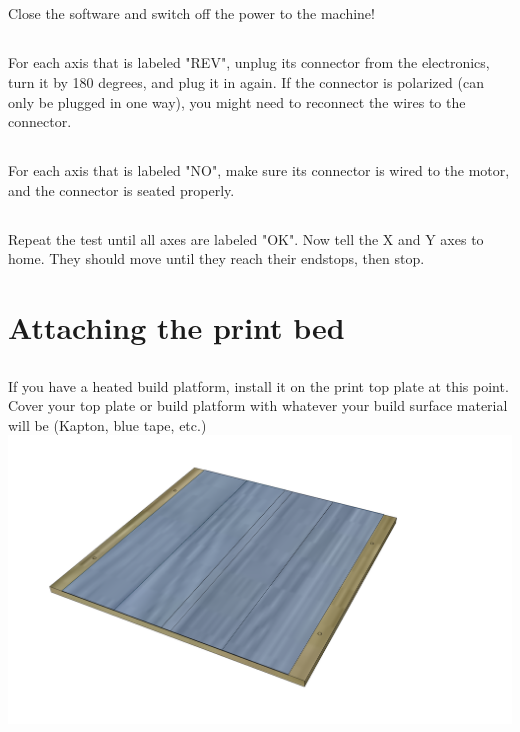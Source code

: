 \documentclass[twoside,openany,a4paper,titlepage]{memoir}
\begin{document}
	\section{}
	Close the software and switch off the power to the machine!
	
	\section{}
	For each axis that is labeled "REV", unplug its connector from the electronics, turn it by 180 degrees,
	and plug it in again. If the connector is polarized (can only be plugged in one way), you might need to
	reconnect the wires to the connector.
	
	\section{}
	For each axis that is labeled "NO", make sure its connector is wired to the motor, and the connector is
	seated properly.
	
	\section{}
	Repeat the test until all axes are labeled "OK". Now tell the X and Y axes to home. They should move
	until they reach their endstops, then stop.
	
	\chapter{Attaching the print bed}
	
	\section{}
	If you have a heated build platform, install it on the print top plate at this point. Cover your top plate or
	build platform with whatever your build surface material will be (Kapton, blue tape, etc.)
	\includegraphics[width=1\linewidth]{graphics/ch11_1.png}
	
\end{document}
